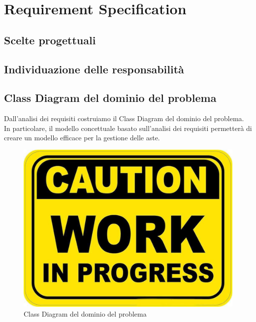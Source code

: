 
\chapter*{Requirement Specification}
    \section{Scelte progettuali}

    \section{Individuazione delle responsabilità}

    \section{Class Diagram del dominio del problema}
        Dall'analisi dei requisiti costruiamo il Class Diagram del dominio del problema.\\
        In particolare, il modello concettuale basato sull'analisi dei requisiti permetterà di creare un modello efficace per la gestione delle aste.\\

        \begin{figure}[htbp!]
            \centering
                \vspace{2\baselineskip}
                \includegraphics[width=\linewidth]{Immagini/WorkInProgress.pdf}
            \caption{Class Diagram del dominio del problema}
            \label{fig:Class Diagram del dominio del problema}
        \end{figure}

